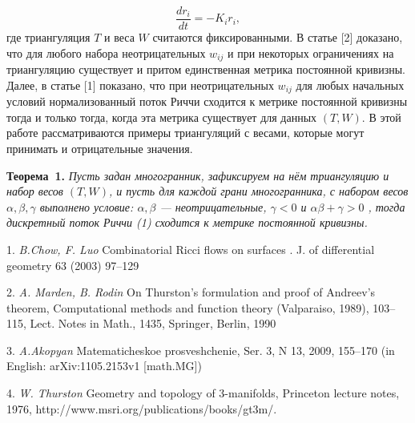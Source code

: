 $$
\dfrac{dr_i}{dt} = -K_i r_i,
$$
где триангуляция $T$ и веса $W$ считаются
фиксированными.
\newline
В статье [2] доказано, что для любого
набора неотрицательных
$w_{ij}$ и при некоторых ограничениях на
триангуляцию существует и
притом единственная метрика постоянной
кривизны. Далее, в статье [1]
показано, что при неотрицательных $w_{ij}$
для любых начальных
условий нормализованный поток Риччи
сходится к метрике постоянной
кривизны тогда и только тогда, когда эта
метрика существует для
данных $(T, W)$.
\newline
В этой работе рассматриваются примеры
триангуляций с весами, которые
могут принимать и отрицательные
значения.

\textbf{Теорема~1.} {\it Пусть задан многогранник, зафиксируем на нём триангуляцию и набор весов $(T, W)$, и пусть для каждой грани многогранника, с набором весов $ \alpha, \beta, \gamma $ выполнено условие: $\alpha, \beta$ --- неотрицательные, $\gamma < 0$ и $ \alpha \beta + \gamma > 0 $ , тогда дискретный поток Риччи (1) сходится к метрике постоянной кривизны.}

%

\litlist

1. {\it B.Chow, F. Luo} Combinatorial Ricci flows on surfaces . J. of differential geometry 63 (2003) 97–129

2. {\it A. Marden, B. Rodin} On Thurston’s formulation and proof of Andreev’s theorem, Computational methods and function theory (Valparaiso, 1989), 103–115, Lect. Notes in Math., 1435, Springer, Berlin, 1990

3. {\it A.Akopyan  } Matematicheskoe prosveshchenie, Ser. 3, N 13, 2009, 155–170 (in English: arXiv:1105.2153v1 [math.MG])

4. {\it W. Thurston } Geometry and topology of 3-manifolds, Princeton lecture notes, 1976, http://www.msri.org/publications/books/gt3m/.
